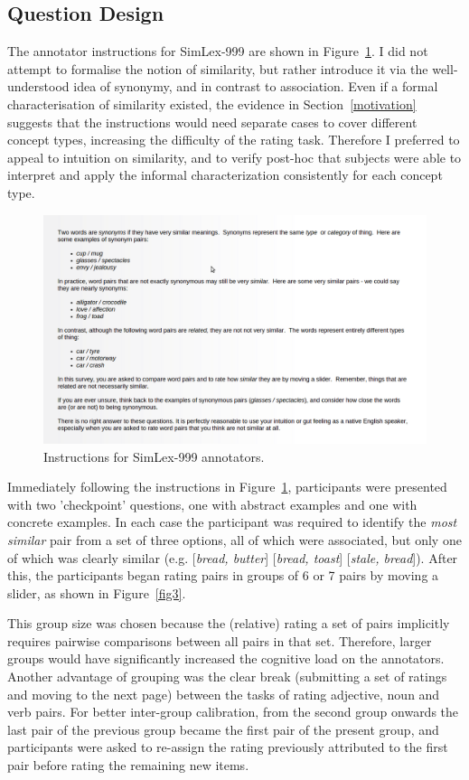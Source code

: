 \subsection{Question Design}

The annotator instructions for SimLex-999 are shown in Figure~\ref{fig2}. I did not attempt to formalise the notion of similarity, but rather introduce it via the well-understood idea of synonymy, and in contrast to association. Even if a formal characterisation of similarity existed, the evidence in Section~\ref{motivation} suggests that the instructions would need separate cases to cover different concept types, increasing the difficulty of the rating task. Therefore I preferred to appeal to intuition on similarity, and to verify post-hoc that subjects were able to interpret and apply the informal characterization consistently for each concept type. 

\begin{figure}[ht]  \includegraphics[width = \textwidth]{Chapter_2/screenshot1_CL}  \caption{\label{fig2} Instructions for SimLex-999 annotators.}\end{figure} 

Immediately following the instructions in Figure~\ref{fig2}, participants were presented with two 'checkpoint' questions, one with abstract examples and one with concrete examples. In each case the participant was required to identify the \emph{most similar} pair from a set of three options, all of which were associated, but only one of which was clearly similar (e.g. [\emph{bread, butter}] [\emph{bread, toast}] [\emph{stale, bread}]). After this, the participants began rating pairs in groups of 6 or 7 pairs by moving a slider, as shown in Figure~\ref{fig3}.

This group size was chosen because the (relative) rating a set of pairs implicitly requires pairwise comparisons between all pairs in that set. Therefore, larger groups would have significantly increased the cognitive load on the annotators. Another advantage of grouping was the clear break (submitting a set of ratings and moving to the next page) between the tasks of rating adjective, noun and verb pairs. For better inter-group calibration, from the second group onwards the last pair of the previous group became the first pair of the present group, and participants were asked to re-assign the rating previously attributed to the first pair before rating the remaining new items.  

